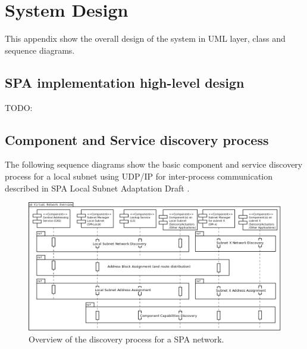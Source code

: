 \chapter{System Design}\label{ch:appendix_design}
This appendix show the overall design of the system in UML layer, class and
sequence diagrams.

\section{SPA implementation high-level design}\label{sec:layered_design}
TODO:

\section{Component and Service discovery process}\label{sec:discovery_process}
The following sequence diagrams show the basic component and service discovery
process for a local subnet using UDP/IP for inter-process communication
described in SPA Local Subnet Adaptation Draft \cite{spa:local-subnet}.

\begin{figure}[h]
    \centering
    \includegraphics[width=\textwidth]{figures/vn_discovery_overview}
    \caption{Overview of the discovery process for a SPA network.}
    \label{fig:appendix_vn_discovery_overview}
\end{figure}

